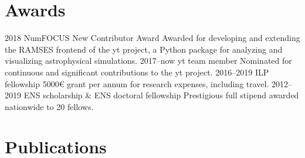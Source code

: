 \documentclass[]{cv-style}
\begin{document}
\section{Awards}
\begin{entrylist}
\entry
{2018}
{NumFOCUS New Contributor Award}
{}
{Awarded for developing and extending the RAMSES frontend of the yt project, a Python package for analyzing and visualizing astrophysical simulations.}
\entry
{2017--now}
{yt team member}
{}
{Nominated for continuous and significant contributions to the yt project.}
\entry
{2016--2019}
{ILP fellowship}
{}
{5000€ grant per annum for research expenses, including travel.}
\entry
{2012--2019}
{ENS scholarship \& ENS doctoral fellowship}
{}
{Prestigious full stipend awarded nationwide to 20 fellows.}
\end{entrylist}

\newpage
\section{Publications}
\end{document}
